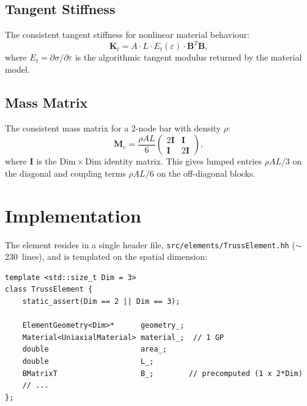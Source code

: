\subsection{Tangent Stiffness}
\label{sec:truss-tangent}

The consistent tangent stiffness for nonlinear material behaviour:
\begin{equation}
    \mathbf{K}_t = A \cdot L \cdot E_t(\varepsilon) \cdot \mathbf{B}^T \mathbf{B},
    \label{eq:truss-Kt}
\end{equation}
where $E_t = \partial\sigma/\partial\varepsilon$ is the algorithmic tangent
modulus returned by the material model.


\subsection{Mass Matrix}
\label{sec:truss-mass}

The consistent mass matrix for a 2-node bar with density $\rho$:
\begin{equation}
    \mathbf{M}_e = \frac{\rho A L}{6}
    \begin{pmatrix}
        2\mathbf{I} & \mathbf{I} \\
        \mathbf{I}  & 2\mathbf{I}
    \end{pmatrix},
    \label{eq:truss-M}
\end{equation}
where $\mathbf{I}$ is the $\mathrm{Dim} \times \mathrm{Dim}$ identity
matrix.  This gives lumped entries $\rho A L / 3$ on the diagonal
and coupling terms $\rho A L / 6$ on the off-diagonal blocks.


\section{Implementation}
\label{sec:truss-implementation}

The element resides in a single header file,
\texttt{src/elements/TrussElement.hh} ($\sim$230~lines), and is templated
on the spatial dimension:

\begin{lstlisting}[style=cppstyle]
template <std::size_t Dim = 3>
class TrussElement {
    static_assert(Dim == 2 || Dim == 3);

    ElementGeometry<Dim>*      geometry_;
    Material<UniaxialMaterial> material_;  // 1 GP
    double                     area_;
    double                     L_;
    BMatrixT                   B_;        // precomputed (1 x 2*Dim)
    // ...
};
\end{lstlisting}

